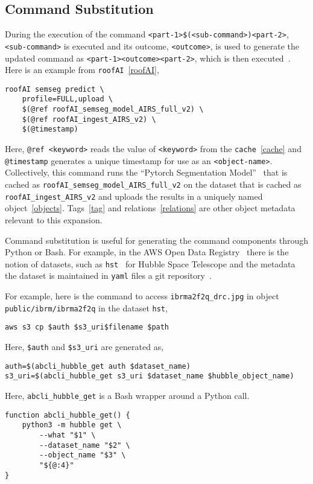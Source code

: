 \subsection{Command Substitution}
\label{command_substitution}

During the execution of the command \texttt{<part-1>\$(<sub-command>)<part-2>}, \texttt{<sub-command>} is executed and its outcome, \texttt{<outcome>}, is used to generate the updated command as \texttt{<part-1><outcome><part-2>}, which is then executed~. Here is an example from \texttt{roofAI}~\ref{roofAI},
%
\begin{verbatim}
roofAI semseg predict \
    profile=FULL,upload \
    $(@ref roofAI_semseg_model_AIRS_full_v2) \
    $(@ref roofAI_ingest_AIRS_v2) \
    $(@timestamp)
\end{verbatim}
%
Here, \texttt{@ref <keyword>} reads the value of \texttt{<keyword>} from the \texttt{cache}~\ref{cache} and \texttt{@timestamp} generates a unique timestamp for use as an \texttt{<object-name>}. Collectively, this command runs the \enquote{Pytorch Segmentation Model}~ that is cached as \texttt{roofAI\_semseg\_model\_AIRS\_full\_v2} on the dataset that is cached as \texttt{roofAI\_ingest\_AIRS\_v2} and uploads the results in a uniquely named object~\ref{objects}. Tags~\ref{tag} and relations~\ref{relations} are other object metadata relevant to this expansion.

Command substitution is useful for generating the command components through Python or Bash. For example, in the AWS Open Data Registry~ there is the notion of datasets, such as \texttt{hst}~ for Hubble Space Telescope and the metadata the dataset is maintained in \texttt{yaml} files a git repository~. 

For example, here is the command to access \texttt{ibrma2f2q\_drc.jpg} in object \texttt{public/ibrm/ibrma2f2q} in the dataset \texttt{hst},
%
\begin{verbatim}
aws s3 cp $auth $s3_uri$filename $path
\end{verbatim}
%
Here, \texttt{\$auth} and \texttt{\$s3\_uri} are generated as,
%
\begin{verbatim}
auth=$(abcli_hubble_get auth $dataset_name)
s3_uri=$(abcli_hubble_get s3_uri $dataset_name $hubble_object_name)
\end{verbatim}
%
Here, \texttt{abcli\_hubble\_get} is a Bash wrapper around a Python call.
%
\begin{verbatim}
function abcli_hubble_get() {
    python3 -m hubble get \
        --what "$1" \
        --dataset_name "$2" \
        --object_name "$3" \
        "${@:4}"
}
\end{verbatim}




